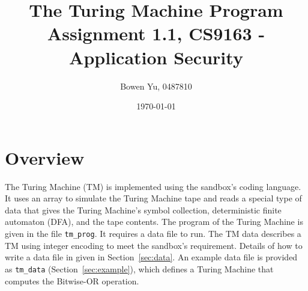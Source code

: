 \documentclass[11pt]{article}
\title{\bf The Turing Machine Program\\[2ex] 
       \rm\Large Assignment 1.1, CS9163 - Application Security}
\author{Bowen Yu, 0487810}
\date{\today}
\begin{document}
\maketitle
\large

\section{Overview}
The Turing Machine (TM) is implemented using the sandbox's coding language. It uses an array to simulate the Turing Machine tape and reads a special type of data that gives the Turing Machine's symbol collection, deterministic finite automaton (DFA), and the tape contents. The program of the Turing Machine is given in the file {\tt tm\_prog}. It requires a data file to run. The TM data describes a TM using integer encoding to meet the sandbox's requirement. Details of how to write a data file in given in Section~\ref{sec:data}. An example data file is provided as {\tt tm\_data} (Section~\ref{sec:example}), which defines a Turing Machine that computes the Bitwise-OR operation.
\end{document}
